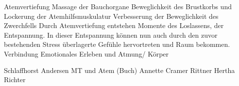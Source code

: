 Atemvertiefung
Massage der Bauchorgane
Beweglichkeit des Brustkorbs und Lockerung der Atemhilfsmuskulatur
Verbesserung der Beweglichkeit des Zwerchfells
Durch Atemvertiefung entstehen Momente des Loslassens, der Entspannung. In dieser Entspannung können nun auch durch den zuvor bestehenden Stress überlagerte Gefühle hervortreten und Raum bekommen. 
Verbindung Emotionales Erleben und Atmung/ Körper







Schlaffhorst Andersen
MT und Atem (Buch)
Annette Cramer
Rittner
Hertha Richter

